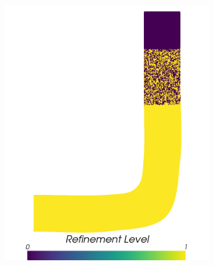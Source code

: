 \begin{figure}[H]
\begin{subfigure}{0.31\linewidth}
		\includegraphics[width=\linewidth]{figs/pipe/euler2D_pipe_adipm_n1-2_refinementLevel.png}
		\caption{}
		\label{fig:adIPMSolutionsPipeSGRI}
	\end{subfigure}\\
	\begin{subfigure}{0.31\linewidth}
		\centering

\end{subfigure}
\end{figure}
